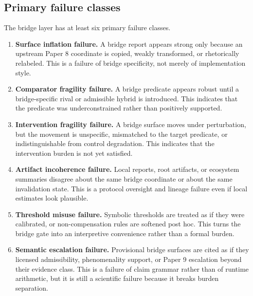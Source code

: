 \documentclass[11pt,a4paper]{article}
\theoremstyle{definition}
\begin{document}
\subsection{Primary failure classes}
The bridge layer has at least six primary failure classes.
\begin{enumerate}[leftmargin=1.5em]
\item \textbf{Surface inflation failure.} A bridge report appears strong only because an upstream Paper 8 coordinate is copied, weakly transformed, or rhetorically relabeled. This is a failure of bridge specificity, not merely of implementation style.
\item \textbf{Comparator fragility failure.} A bridge predicate appears robust until a bridge-specific rival or admissible hybrid is introduced. This indicates that the predicate was underconstrained rather than positively supported.
\item \textbf{Intervention fragility failure.} A bridge surface moves under perturbation, but the movement is unspecific, mismatched to the target predicate, or indistinguishable from control degradation. This indicates that the intervention burden is not yet satisfied.
\item \textbf{Artifact incoherence failure.} Local reports, root artifacts, or ecosystem summaries disagree about the same bridge coordinate or about the same invalidation state. This is a protocol oversight and lineage failure even if local estimates look plausible.
\item \textbf{Threshold misuse failure.} Symbolic thresholds are treated as if they were calibrated, or non-compensation rules are softened post hoc. This turns the bridge gate into an interpretive convenience rather than a formal burden.
\item \textbf{Semantic escalation failure.} Provisional bridge surfaces are cited as if they licensed admissibility, phenomenality support, or Paper 9 escalation beyond their evidence class. This is a failure of claim grammar rather than of runtime arithmetic, but it is still a scientific failure because it breaks burden separation.
\end{enumerate}
\end{document}
